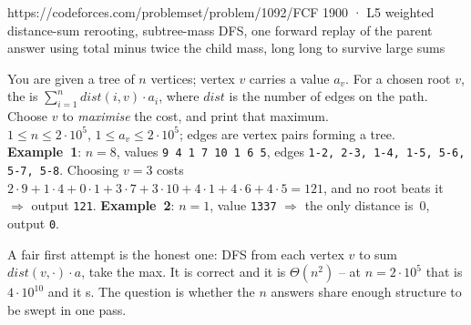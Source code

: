   {https://codeforces.com/problemset/problem/1092/F}{CF 1900 · L5}
  {weighted distance-sum rerooting, subtree-mass DFS, one forward replay of the parent answer using total minus twice the child mass, long long to survive large sums}

\begin{problemstatement}
You are given a tree of $n$ vertices; vertex $v$ carries a value $a_v$. For a chosen root $v$,
the  is $\sum_{i=1}^{n} \mathit{dist}(i,v)\cdot a_i$, where $\mathit{dist}$ is the
number of edges on the path. Choose $v$ to \emph{maximise} the cost, and print that maximum.\\
$1 \le n \le 2\cdot10^{5}$, $1 \le a_v \le 2\cdot10^{5}$; edges are vertex pairs forming a tree.
\textbf{Example~1}: $n=8$, values \texttt{9 4 1 7 10 1 6 5}, edges \texttt{1-2, 2-3, 1-4, 1-5,
5-6, 5-7, 5-8}. Choosing $v=3$ costs $2\cdot9+1\cdot4+0\cdot1+3\cdot7+3\cdot10+4\cdot1+4\cdot6+4\cdot5
= 121$, and no root beats it $\Rightarrow$ output \texttt{121}. \textbf{Example~2}: $n=1$, value
\texttt{1337} $\Rightarrow$ the only distance is~$0$, output \texttt{0}.
\end{problemstatement}

\begin{attemptgate}
A fair first attempt is the honest one: DFS from each vertex $v$ to sum $\mathit{dist}(v,\cdot)\cdot
a$, take the max. It is correct and it is $\Theta(n^2)$ -- at $n=2\cdot10^{5}$ that is $4\cdot10^{10}$
and it \tle s. The question is whether the $n$ answers share enough structure to be swept in one pass.
\end{attemptgate}


